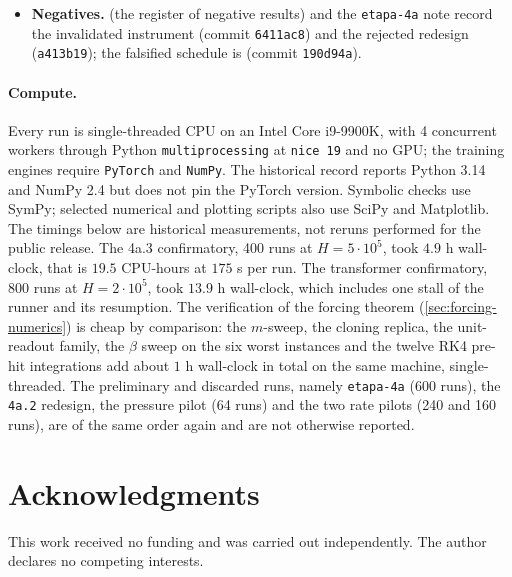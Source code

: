 \documentclass[11pt]{article}
\theoremstyle{definition}
\theoremstyle{remark}
\begin{document}
{\begin{itemize}
; scoping \texttt{d4e4c35}, rate
pilot \texttt{2dba27d}, confirmatory
pre-registration \texttt{1b45498}.
\texttt{python run\_e5.py --workers 4} then \texttt{python analyze\_e5.py}.
\item \textbf{Negatives.}  (the register of
negative results) and the \texttt{etapa-4a} note record the invalidated instrument
(commit \texttt{6411ac8}) and the rejected redesign (\texttt{a413b19}); the
falsified schedule is  (commit \texttt{190d94a}).
\end{itemize}
\par}

\paragraph{Compute.}
Every run is single-threaded CPU on an Intel Core i9-9900K, with 4 concurrent
workers through Python \texttt{multiprocessing} at \texttt{nice 19} and no GPU;
the training engines require \texttt{PyTorch} and \texttt{NumPy}. The
historical record reports Python 3.14 and NumPy 2.4 but does not pin the
PyTorch version. Symbolic checks use SymPy; selected numerical and plotting
scripts also use SciPy and Matplotlib. The timings below are historical
measurements, not reruns performed for the public release. The 4a.3
confirmatory, 400 runs at $H=5\cdot10^{5}$, took $4.9$ h wall-clock, that is
$19.5$ CPU-hours at $175$ s per run. The transformer confirmatory, 800 runs at
$H=2\cdot10^{5}$, took $13.9$ h wall-clock, which includes one stall of the
runner and its resumption. The verification of the forcing theorem
(\cref{sec:forcing-numerics}) is cheap by comparison: the $m$-sweep, the
cloning replica, the unit-readout family, the $\beta$ sweep on the six worst
instances and the twelve RK4 pre-hit integrations add about $1$ h wall-clock in
total on the same machine, single-threaded. The preliminary and discarded
runs, namely \texttt{etapa-4a} (600 runs), the \texttt{4a.2} redesign, the
pressure pilot (64
runs) and the two rate pilots (240 and 160 runs), are of the same order again and
are not otherwise reported.

\section*{Acknowledgments}
This work received no funding and was carried out independently. The author
declares no competing interests.
\end{document}

